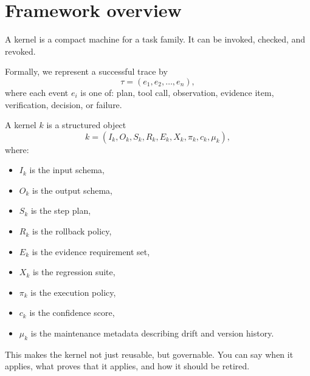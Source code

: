 \documentclass{article}
\begin{document}
\section{Framework overview}

A kernel is a compact machine for a task family. It can be invoked, checked, and revoked.

Formally, we represent a successful trace by
\[
\tau = (e_1, e_2, \dots, e_n),
\]
where each event $e_i$ is one of: plan, tool call, observation, evidence item, verification, decision, or failure.

A kernel $k$ is a structured object
\[
 k = (I_k, O_k, S_k, R_k, E_k, X_k, \pi_k, c_k, \mu_k),
\]
where:
\begin{itemize}[leftmargin=1.2em]
\item $I_k$ is the input schema,
\item $O_k$ is the output schema,
\item $S_k$ is the step plan,
\item $R_k$ is the rollback policy,
\item $E_k$ is the evidence requirement set,
\item $X_k$ is the regression suite,
\item $\pi_k$ is the execution policy,
\item $c_k$ is the confidence score,
\item $\mu_k$ is the maintenance metadata describing drift and version history.
\end{itemize}

This makes the kernel not just reusable, but governable. You can say when it applies, what proves that it applies, and how it should be retired.
\end{document}
